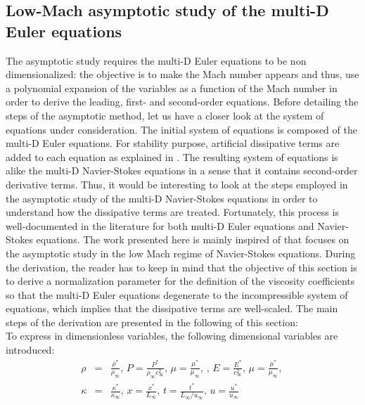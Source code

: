 \subsection{Low-Mach asymptotic study of the multi-D Euler equations} \label{sec:lowMach}
The asymptotic study requires the multi-D Euler equations to be non dimensionalized: the objective is to make the Mach number appears and thus, use a polynomial expansion of the variables as a function of the Mach number in order to derive the leading, first- and second-order equations. Before detailing the steps of the asymptotic method, let us have a closer look at the system of equations under consideration. The initial system of equations is composed of the multi-D Euler equations. For stability purpose, artificial dissipative terms are added to each equation as explained in . The resulting system of equations is alike the multi-D Navier-Stokes equations in a sense that it contains second-order derivative terms. Thus, it would be interesting to look at the steps employed in the asymptotic study of the multi-D Navier-Stokes equations in order to understand how the dissipative terms are treated. Fortunately, this process is well-documented in the literature \cite{LowMach1, LowMach2, LowMach3} for both multi-D Euler equations and Navier-Stokes equations. The work presented here is mainly inspired of \cite{Muller} that focuses on the asymptotic study in the low Mach regime of Navier-Stokes equations. During the derivation, the reader has to keep in mind that the objective of this section is to derive a normalization parameter for the definition of the viscosity coefficients so that the multi-D Euler equations degenerate to the incompressible system of equations, which implies that the dissipative terms are well-scaled. The main steps of the derivation are presented in the following of this section: \\
To express  in dimensionless variables, the following dimensional variables are introduced:
\begin{eqnarray}
\label{eq:norm_param}
\rho &=& \frac{\rho^*}{\rho_{\infty}} \text{, } P = \frac{P^*}{\rho_{\infty}c^2_{\infty}} \text{, } \mu = \frac{\mu^*}{\mu_{\infty}} \text{, } \text{, }  E = \frac{E^*}{c^2_{\infty} } \text{, } 
\mu = \frac{\mu^*}{\mu_{\infty}} \text{, }\nonumber \\
 \kappa &=& \frac{\kappa^*}{\kappa_{\infty}} \text{, }
x = \frac{x^*}{L_{\infty}} \text{, } t = \frac{t^*}{L_{\infty} / u_{\infty}} \text{, } u = \frac{u^*}{u_{\infty}}
\end{eqnarray}
